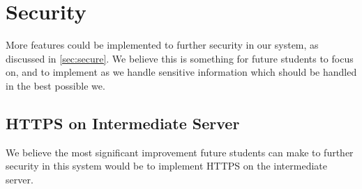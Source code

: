 \section{Security}\label{sec:fucture_secure}
More features could be implemented to further security in our system, as discussed in \cref{sec:secure}. We believe this is something for future students to focus on, and to implement as we handle sensitive information which should be handled in the best possible we.

\subsection{HTTPS on Intermediate Server}
We believe the most significant improvement future students can make to further security in this system would be to implement HTTPS on the intermediate server.